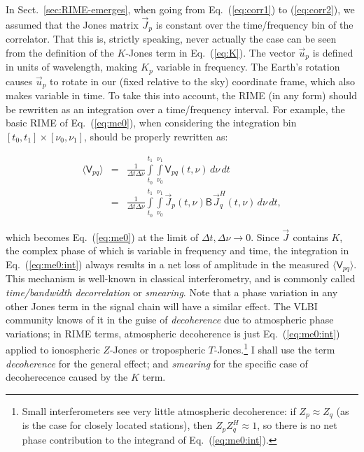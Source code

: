 \documentclass[referee]{aa}
\newcommand{\herm}{H}
\newcommand{\jones}[2]{\vec {#1}_{#2}}
\newcommand{\jonesT}[2]{\vec {#1}^{\herm}_{#2}}
\newcommand{\coh}[2]{\mathsf{{#1}}_{{#2}}}
\begin{document}
In Sect.~\ref{sec:RIME-emerges}, when going from Eq.~(\ref{eq:corr1}) to (\ref{eq:corr2}), we assumed that the Jones matrix $\jones{J}{p}$ is constant over the time/frequency bin of the correlator. That this is, strictly speaking, never actually the case can be seen from the definition of the $K$-Jones term in Eq.~(\ref{eq:K}). The vector $\vec u_p$ is defined in units of wavelength, making $K_p$ variable in frequency. The Earth's rotation causes $\vec u_p$ to rotate in our (fixed relative to the sky) coordinate frame, which also makes variable in time. To take this into account, the RIME (in any form) should be rewritten as an integration over a time/frequency interval. For example, the basic RIME of Eq.~(\ref{eq:me0}), when considering the integration bin $[t_0,t_1]\times[\nu_0,\nu_1]$, should be properly rewritten as:

\begin{eqnarray}
\langle \coh{V}{pq} \rangle & = & \frac{1}{\Delta t\Delta\nu}\int\limits^{t_1}_{t_0} \int\limits^{\nu_1}_{\nu_0} \coh{V}{pq}(t,\nu)\,d\nu\,dt \nonumber \\
\label{eq:me0:int}
& = & \frac{1}{\Delta t\Delta\nu}\int\limits^{t_1}_{t_0} \int\limits^{\nu_1}_{\nu_0} \jones{J}{p} (t,\nu) \coh{B}{}  \jonesT{J}{q}(t,\nu) \, d\nu\,dt,
\end{eqnarray}

which becomes Eq.~(\ref{eq:me0}) at the limit of $\Delta t,\Delta\nu \to 0$. Since $\jones{J}{}$ contains $K$, the complex phase of which is variable in frequency and time, the integration in Eq.~(\ref{eq:me0:int}) always results in a net loss of amplitude in the measured $\langle \coh{V}{pq} \rangle $. This mechanism is well-known in classical interferometry, and is commonly called {\em time/bandwidth decorrelation} or {\em smearing}. Note that a phase variation in any other Jones term in the signal chain will have a similar effect. The VLBI community knows of it in the guise of {\em decoherence} due to atmospheric phase variations; in RIME terms, atmospheric decoherence is just Eq.~(\ref{eq:me0:int}) applied to ionospheric $Z$-Jones or tropospheric $T$-Jones.\footnote{Small interferometers see very little atmospheric decoherence: if $Z_p\approx Z_q$ (as is the case for closely located stations), then $Z_p Z^\herm_q \approx 1$, so there is no net phase contribution to the integrand of Eq.~(\ref{eq:me0:int}).} I shall use the term {\em decoherence} for the general effect; and {\em smearing} for the specific case of decoherecence caused by the $K$ term.
\end{document}
